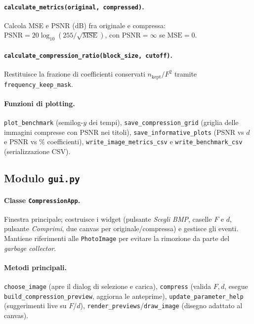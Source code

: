 \documentclass[11pt,a4paper]{article}
\begin{document}
\paragraph{\texttt{calculate\_metrics(original, compressed)}.}
Calcola MSE e PSNR (dB) fra originale e compressa:
$\mathrm{PSNR}=20\log_{10}(255/\sqrt{\mathrm{MSE}})$, con $\mathrm{PSNR}=\infty$
se $\mathrm{MSE}=0$.

\paragraph{\texttt{calculate\_compression\_ratio(block\_size, cutoff)}.}
Restituisce la frazione di coefficienti conservati
$n_{\text{kept}}/F^2$ tramite \texttt{frequency\_keep\_mask}.

\paragraph{Funzioni di plotting.}
\texttt{plot\_benchmark} (semilog-$y$ dei tempi), \texttt{save\_compression\_grid}
(griglia delle immagini compresse con PSNR nei titoli),
\texttt{save\_informative\_plots} (PSNR vs $d$ e PSNR vs \% coefficienti),
\texttt{write\_image\_metrics\_csv} e \texttt{write\_benchmark\_csv}
(serializzazione CSV).

\subsection{Modulo \texttt{gui.py}}

\paragraph{Classe \texttt{CompressionApp}.}
Finestra principale; costruisce i widget (pulsante \emph{Scegli BMP}, caselle
$F$ e $d$, pulsante \emph{Comprimi}, due canvas per originale/compressa) e gestisce
gli eventi. Mantiene riferimenti alle \texttt{PhotoImage} per evitare la
rimozione da parte del \emph{garbage collector}.

\paragraph{Metodi principali.}
\texttt{choose\_image} (apre il dialog di selezione e carica),
\texttt{compress} (valida $F,d$, esegue \texttt{build\_compression\_preview},
aggiorna le anteprime), \texttt{update\_parameter\_help} (suggerimenti live su
$F$/$d$), \texttt{render\_previews}/\texttt{draw\_image} (disegno adattato al
canvas).
\end{document}
